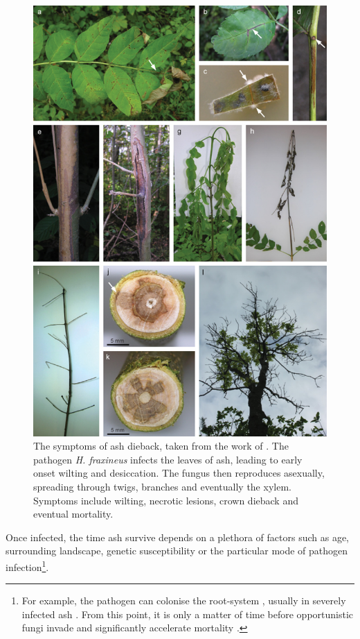 \begin{figure}
    \centering
    \includegraphics[scale=0.5]{chapter2/figures/gross2014.jpg}
    \caption{The symptoms of ash dieback, taken from the work of \cite{gross2014h}. The pathogen \textit{H. fraxineus} infects the leaves of ash, leading to early onset wilting and desiccation. The fungus then reproduces asexually, spreading through twigs, branches and eventually the xylem. Symptoms include wilting, necrotic lesions, crown dieback and eventual mortality.}
    \label{fig:my_label}
\end{figure}
 Once infected, the time ash survive depends on a plethora of factors such as age, surrounding landscape, genetic susceptibility or the particular mode of pathogen infection\footnote{For example, the pathogen can colonise the root-system \cite{schumacher2011general}, usually in severely infected ash \cite{https://doi.org/10.1111/mpp.12073}. From this point, it is only a matter of time before opportunistic fungi invade and significantly accelerate mortality \cite{enderle2013temporal}.}. 
 

